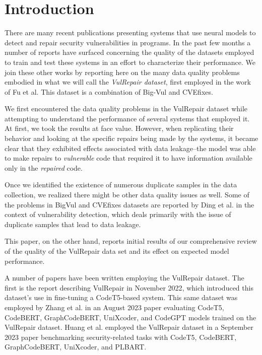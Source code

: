 \section{Introduction}\label{Introduction}
There are many recent publications presenting systems that use neural models to detect and repair security vulnerabilities in programs\cite{chen2022neural,fu2022vulrepair,zhang2023pre,huang2023empirical,fu2024vision,mastropaolo2024training}.
In the past few months a number of reports have surfaced concerning the quality of the datasets employed to train and test these systems in an effort to characterize their performance\cite{mastropaolo2024training,ding2024vulnerability}.
We join these other works by reporting here on the many data quality problems embodied in what we will call the \emph{VulRepair dataset}, first employed in the work of Fu et al.\cite{fu2022vulrepair}
This dataset is a combination of Big-Vul\cite{fan2020ac} and CVEfixes\cite{bhandari2021cvefixes}.


We first encountered the data quality problems in the VulRepair dataset while attempting to understand the performance of several systems that employed it.
At first, we took the results at face value.
However, when replicating their behavior and looking at the specific repairs being made by the systems, it became clear that they exhibited effects associated with data leakage--the model was able to make repairs to \emph{vulnerable} code that required it to have information available only in the \emph{repaired} code.

Once we identified the existence of numerous duplicate samples in the data collection, we realized there might be other data quality issues as well.
Some of the problems in BigVul and CVEfixes datasets are reported by Ding et al.\cite{ding2024vulnerability} in the context of vulnerability detection, which deals primarily with the issue of duplicate samples that lead to data leakage.


This paper, on the other hand, reports initial results of our comprehensive review of the quality of the VulRepair data set and its effect on expected model performance.

A number of papers have been written employing the VulRepair dataset. The first is the report describing VulRepair in November 2022\cite{fu2022vulrepair}, which introduced this dataset's use in fine-tuning a CodeT5-based system. 
This same dataset was employed by Zhang et al. in an August 2023 paper evaluating CodeT5, CodeBERT, GraphCodeBERT, UniXcoder, and CodeGPT models trained on the VulRepair dataset\cite{zhang2023pre}.
Huang et al. employed the VulRepair dataset in a September 2023 paper benchmarking security-related tasks with CodeT5, CodeBERT, GraphCodeBERT, UniXcoder, and PLBART\cite{huang2023empirical}.

